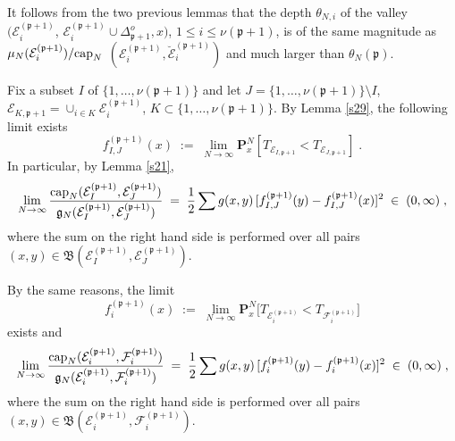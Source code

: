 \documentclass[reqno]{amsart}
\begin{document}
It follows from the two previous lemmas that the depth $\theta_{N,i}$
of the valley $({{\mathcal E}}^{({{\mathfrak p}} +1)}_i$, ${{\mathcal E}}^{({{\mathfrak p}} +1)}_i \cup
\Delta^o_{{{\mathfrak p}}+1} ,x)$, $1\le i\le \nu({{\mathfrak p}}+1)$, is of the same
magnitude as $\mu_N({{\mathcal E}}^{({{\mathfrak p}} +1)}_i) / {{\rm cap}}_N$ $({{\mathcal E}}^{({{\mathfrak p}}
  +1)}_i , \breve{{{\mathcal E}}}^{({{\mathfrak p}} +1)}_i)$ and much larger than
$\theta_N({{\mathfrak p}})$. 

Fix a subset $I$ of $\{1, \dots, \nu({{\mathfrak p}} +1)\}$ and let $J=\{1,
\dots, \nu({{\mathfrak p}}+1)\} \setminus I$, ${{\mathcal E}}_{K, {{\mathfrak p}}+1} = \cup_{i\in
  K} {{\mathcal E}}^{({{\mathfrak p}}+1)}_i$, $K\subset \{1, \dots, \nu({{\mathfrak p}}+1)\}$. By
Lemma \ref{s29}, the following limit exists
\begin{equation*}
f^{({{\mathfrak p}}+1)}_{I,J}(x) \;:=\; 
\lim_{N\to\infty} {{\mathbf P}}^{N}_x[T_{{{\mathcal E}}_{I, {{\mathfrak p}}+1}} < 
T_{{{\mathcal E}}_{J, {{\mathfrak p}}+1}}] \;.
\end{equation*}
In particular, by Lemma \ref{s21},
\begin{equation*}
\lim_{N\to\infty} \frac {{{\rm cap}}_N({{\mathcal E}}^{({{\mathfrak p}}+1)}_I, {{\mathcal E}}^{({{\mathfrak p}}+1)}_J)}
{{{\mathfrak g}}_N({{\mathcal E}}^{({{\mathfrak p}}+1)}_I,{{\mathcal E}}^{({{\mathfrak p}}+1)}_J)}  \;=\; 
\frac 12 \sum g(x,y) 
\, [f^{({{\mathfrak p}}+1)}_{I,J} (y) - f^{({{\mathfrak p}}+1)}_{I,J} (x)]^2 \;\in\;
(0,\infty) \;,
\end{equation*}
where the sum on the right hand side is performed over all pairs
$(x,y) \in {{\mathfrak B}}({{\mathcal E}}^{({{\mathfrak p}}+1)}_I, {{\mathcal E}}^{({{\mathfrak p}}+1)}_J)$.

By the same reasons, the limit 
\begin{equation*}
f^{({{\mathfrak p}}+1)}_{i}(x) \;:=\; 
\lim_{N\to\infty} {{\mathbf P}}^{N}_x\Big[T_{{{\mathcal E}}^{({{\mathfrak p}}+1)}_{i}} < 
T_{{{\mathcal F}}^{({{\mathfrak p}} +1)}_i}\Big] 
\end{equation*}
exists and
\begin{equation*}
\lim_{N\to\infty} \frac {{{\rm cap}}_N({{\mathcal E}}^{({{\mathfrak p}}+1)}_{i} , 
{{\mathcal F}}^{({{\mathfrak p}} +1)}_i)}
{{{\mathfrak g}}_N({{\mathcal E}}^{({{\mathfrak p}}+1)}_{i} , {{\mathcal F}}^{({{\mathfrak p}} +1)}_i )} \;=\;  
\frac 12 \sum g(x,y) 
\, [f^{({{\mathfrak p}}+1)}_{i} (y) - f^{({{\mathfrak p}}+1)}_{i} (x)]^2  \;\in\;
(0,\infty) \;,
\end{equation*}
where the sum on the right hand side is performed over all pairs
$(x,y) \in {{\mathfrak B}}({{\mathcal E}}^{({{\mathfrak p}}+1)}_{i} , {{\mathcal F}}^{({{\mathfrak p}} +1)}_i)$.
\end{document}
